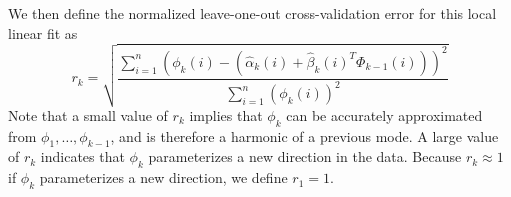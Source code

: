 \documentclass[preprint]{elsarticle}
\begin{document}
We then define the normalized leave-one-out cross-validation error for this local linear fit as
\begin{equation} \label{eq:cv_error}
r_{k} = \sqrt{ \frac{\sum_{i=1}^n \left( \phi_{k} (i) - (\hat{\alpha}_k(i) + \hat{\beta}_k(i)^T \Phi_{k-1}(i))  \right)^2} {\sum_{i=1}^n  \left( \phi_{k} (i) \right)^2 }}
\end{equation}
%
%
%
%
%
Note that a small value of $r_k$ implies that $\phi_{k}$ can be accurately approximated from $\phi_1, \dots, \phi_{k-1}$, and is therefore a harmonic of a previous mode.
%
A large value of $r_{k}$ indicates that $\phi_{k}$ parameterizes a new direction in the data.
%
Because $r_{k} \approx 1$ if $\phi_{k}$ parameterizes a new direction, we define $r_1 = 1$.
\end{document}
